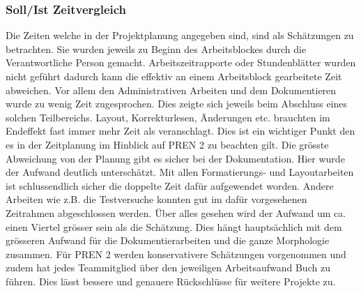 \subsubsection{Soll/Ist Zeitvergleich}
Die Zeiten welche in der Projektplanung angegeben sind, sind als Schätzungen 
zu betrachten. Sie wurden jeweils zu Beginn des Arbeitsblockes durch die 
Verantwortliche Person gemacht. Arbeitszeitrapporte oder Stundenblätter wurden 
nicht geführt dadurch kann die effektiv an einem Arbeitsblock gearbeitete Zeit 
abweichen. Vor allem den Administrativen Arbeiten und dem Dokumentieren wurde 
zu wenig Zeit zugesprochen. Dies zeigte sich jeweils beim Abschluss eines 
solchen Teilbereichs. Layout, Korrekturlesen, Änderungen etc. brauchten im 
Endeffekt fast immer mehr Zeit als veranschlagt. Dies ist ein wichtiger Punkt 
den es in der Zeitplanung im Hinblick auf PREN 2 zu beachten gilt. Die grösste 
Abweichung von der Planung gibt es sicher bei der Dokumentation. Hier wurde 
der Aufwand deutlich unterschätzt. Mit allen Formatierungs- und Layoutarbeiten 
ist schlussendlich sicher die doppelte Zeit dafür aufgewendet worden. Andere 
Arbeiten wie z.B. die Testversuche konnten gut im dafür vorgesehenen Zeitrahmen 
abgeschlossen werden. Über alles gesehen wird der Aufwand um ca. einen Viertel 
grösser sein als die Schätzung. Dies hängt hauptsächlich mit dem grösseren 
Aufwand für die Dokumentierarbeiten und die ganze Morphologie zusammen. Für 
PREN 2 werden konservativere Schätzungen vorgenommen und zudem hat jedes 
Teammitglied über den jeweiligen Arbeitsaufwand Buch zu führen. Dies lässt 
bessere und genauere Rückschlüsse für weitere Projekte zu. 